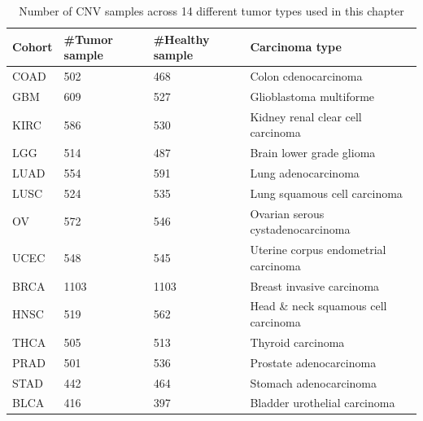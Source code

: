 \begin{table} [!ht]
    \small
    \caption{Number of CNV samples across 14 different tumor types used in this chapter}
    \vspace{-2mm}
    \label{table:alldatadetails}
    \centering
    \begin{tabular}{l|l|l|l}
        \hline
        \rowcolor{Gray}
         \textbf{Cohort} & \textbf{\#Tumor sample} & \textbf{\#Healthy sample} & \textbf{Carcinoma type} \\\hline
        COAD & 502 & 468 & Colon cdenocarcinoma \\\hline
        GBM  & 609 & 527 & Glioblastoma multiforme \\\hline
        KIRC & 586 & 530 & Kidney renal clear cell carcinoma  \\\hline
        LGG  & 514 & 487 & Brain lower grade glioma \\\hline
        LUAD & 554 & 591 & Lung adenocarcinoma \\\hline
        LUSC & 524 & 535 & Lung squamous cell carcinoma \\\hline
        OV   & 572 & 546 & Ovarian serous cystadenocarcinoma \\\hline
        UCEC & 548 & 545 & Uterine corpus endometrial carcinoma \\\hline
        BRCA & 1103 & 1103 & Breast invasive carcinoma  \\\hline 
        HNSC & 519 & 562 & Head \& neck squamous cell carcinoma \\\hline 
        THCA & 505 & 513 & Thyroid carcinoma \\\hline 
        PRAD & 501 & 536 & Prostate adenocarcinoma \\\hline 
        STAD & 442 & 464 & Stomach adenocarcinoma \\\hline 
        BLCA & 416 & 397 & Bladder urothelial carcinoma \\\hline 
    \end{tabular}
    \vspace{-2mm}
\end{table}


